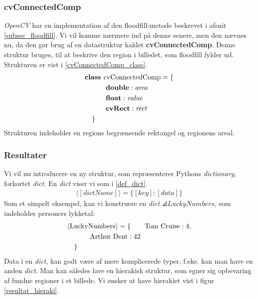 {\subsubsection{cvConnectedComp}
\emph{OpenCV} har en implementation af den floodfill-metode beskrevet i
afsnit \ref{subsec_floodfill}. Vi vil komme nærmere ind på denne senere,
men den nævnes nu, da den gør brug af en datastruktur kaldet
\textbf{cvConnectedComp}. Denne struktur bruges, til at beskrive den
region i billedet, som floodfill fylder ud.  Strukturen er vist i
\eqref{cvConnectedComp_class}.
\begin{multline}
    \textbf{class~} \textrm{cvConnectedComp} = \{ \\
    \shoveleft{\qquad\textbf{double} : \textit{area}} \\
    \shoveleft{\qquad\textbf{float} : \textit{value}} \\
    \shoveleft{\qquad\textbf{cvRect} : \textit{rect}} \\
    \shoveleft{\}}\shoveright{}
    \label{cvConnectedComp_class}
\end{multline}
Strukturen indeholder en regions begrænsende rektangel og regionens
areal.

\subsubsection{Resultater}
Vi vil nu introducere en ny struktur, som repræsenterer Pythons
\emph{dictionary}, forkortet \emph{dict}.  En \emph{dict} viser vi som i
\ref{def_dict}.
\begin{eqnarray}
    \langle[\textit{dictName}]\rangle = \{ [\textit{key}] : [\textit{data}] \}
    \label{def_dict}
\end{eqnarray}
Som et simpelt eksempel, kan vi konstruere en \emph{dict}
$\angles{LuckyNumbers}$, som indeholder personers lykketal:
\begin{multline}
    \angles{LuckyNumbers} = \{ \qquad \textrm{Tom Cruise} : 4 , \\
    \textrm{Arthur Dent} : 42 \qquad\qquad\\
    \shoveleft{\}}\shoveright{}
    \label{lucky_dict}
\end{multline}
Data i en \emph{dict}, kan godt være af mere komplicerede typer, f.eks.
kan man have en anden \emph{dict}. Man kan således lave en hierakisk
struktur, som egner sig opbevaring af fundne regioner i et billede. Vi
ønsker at have hierakiet vist i figur \ref{resultat_hieraki}.

}
